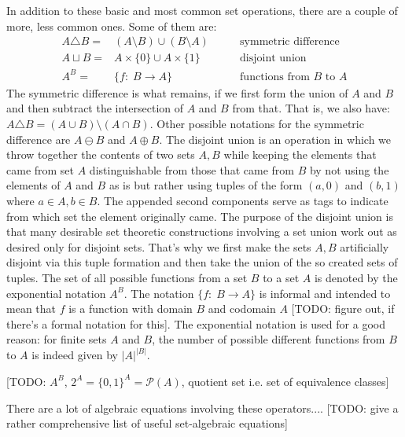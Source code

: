 \medskip
In addition to these basic and most common set operations, there are a couple of more, less common ones. Some of them are:
\begin{eqnarray}
 A \triangle B =& (A \setminus B) \cup (B \setminus A)      \qquad &\text{symmetric difference} \\
 A \sqcup B    =& A \times \{ 0 \}  \cup  A \times \{ 1 \}  \qquad &\text{disjoint union} \\
 A ^ B         =& \{ f: \; B \rightarrow A  \}              \qquad &\text{functions from $B$ to $A$} 
\end{eqnarray}
The symmetric difference is what remains, if we first form the union of $A$ and $B$ and then subtract the intersection of $A$ and $B$ from that. That is, we also have: $A \triangle B = (A \cup B) \setminus (A \cap B)$. Other possible notations for the symmetric difference are $A \ominus B$ and $A \oplus B$. The disjoint union is an operation in which we throw together the contents of two sets $A,B$ while keeping the elements that came from set $A$ distinguishable from those that came from $B$ by not using the elements of $A$ and $B$ as is but rather using tuples of the form $(a,0)$ and $(b,1)$ where $a \in A, b \in B$. The appended second components serve as tags to indicate from which set the element originally came. The purpose of the disjoint union is that many desirable set theoretic constructions involving a set union work out as desired only for disjoint sets. That's why we first make the sets $A,B$ artificially disjoint via this tuple formation and then take the union of the so created sets of tuples. The set of all possible functions from a set $B$ to a set $A$ is denoted by the exponential notation $A^B$. The notation $\{ f: \; B \rightarrow A \}$ is informal and intended to mean that $f$ is a function with domain $B$ and codomain $A$ [TODO: figure out, if there's a formal notation for this]. The exponential notation is used for a good reason: for finite sets $A$ and $B$, the number of possible different functions from $B$ to $A$ is indeed given by $|A|^{|B|}$.

[TODO: $A^B$, $2^A = \{0,1\}^A = \mathcal{P}(A) $, quotient set i.e. set of equivalence classes]


\medskip
There are a lot of algebraic equations involving these operators.... [TODO: give a rather comprehensive list of useful set-algebraic equations]




